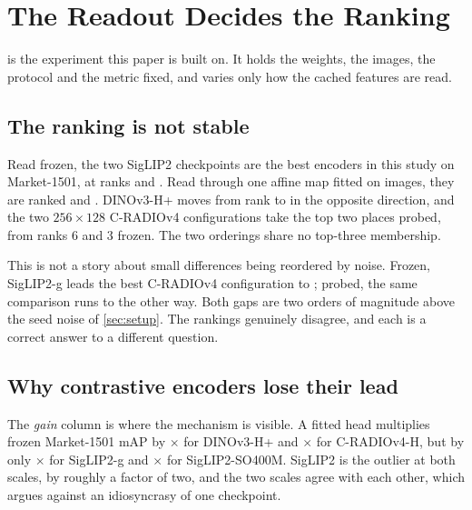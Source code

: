 \section{The Readout Decides the Ranking}\label{sec:readout}
 is the experiment this paper is built on. It holds the weights, the images,
the protocol and the metric fixed, and varies only how the cached features are read.

\begin{table}[t]
\centering
\caption{Market-1501 mAP under each readout, over identical cached features. \emph{rank} is the
encoder's position among the \nEncoderConfigs{} configurations when read frozen and when read
through the ArcFace head; \emph{gain} is the ratio of the two. The two CLIP rows are the same
checkpoint at the same input size under the two resize geometries. Values at three decimals;
the text quotes four.}
\label{tab:readout}

\end{table}

\subsection{The ranking is not stable}
Read frozen, the two SigLIP2 checkpoints are the best encoders in this study on Market-1501,
at ranks \rankSiglipgFrozen{} and \rankSiglipsoFrozen{}. Read through one affine map fitted on
\nHeadImages{} images, they are ranked \rankSiglipgProbed{} and \rankSiglipsoProbed{}. DINOv3-H+
moves from rank \rankDinohpFrozen{} to \rankDinohpProbed{} in the opposite direction, and the
two $256\times128$ C-RADIOv4 configurations take the top two places probed, from ranks 6 and 3
frozen. The two orderings share no top-three membership.

This is not a story about small differences being reordered by noise. Frozen, SigLIP2-g leads
the best C-RADIOv4 configuration \mapSiglipgFrozen{} to \mapRadiohFrozen{}; probed, the same
comparison runs \mapRadiohProbed{} to \mapSiglipgProbed{} the other way. Both gaps are two
orders of magnitude above the seed noise of \cref{sec:setup}. The rankings genuinely disagree,
and each is a correct answer to a different question.

\subsection{Why contrastive encoders lose their lead}
The \emph{gain} column is where the mechanism is visible. A fitted head multiplies frozen
Market-1501 mAP by \gainDinohp{}$\times$ for DINOv3-H+ and \gainRadioh{}$\times$ for
C-RADIOv4-H, but by only \gainSiglipg{}$\times$ for SigLIP2-g and \gainSiglipso{}$\times$ for
SigLIP2-SO400M. SigLIP2 is the outlier at both scales, by roughly a factor of two, and the two
scales agree with each other, which argues against an idiosyncrasy of one checkpoint.

